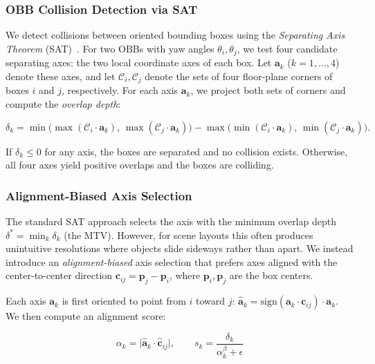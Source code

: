 \subsubsection{OBB Collision Detection via SAT}
\label{sec:method:obb_sat}

We detect collisions between oriented bounding boxes using the \emph{Separating Axis Theorem} (SAT)~\cite{gottschalk1996obbtree}.
For two OBBs with yaw angles $\theta_i, \theta_j$, we test four candidate separating axes: the two local coordinate axes of each box.
Let $\mathbf{a}_k$ ($k = 1, \ldots, 4$) denote these axes, and let $\mathcal{C}_i, \mathcal{C}_j$ denote the sets of four floor-plane corners of boxes $i$ and $j$, respectively.
For each axis $\mathbf{a}_k$, we project both sets of corners and compute the \emph{overlap depth}:

\begin{equation}
\delta_k = \min\!\big(\max(\mathcal{C}_i \cdot \mathbf{a}_k),\, \max(\mathcal{C}_j \cdot \mathbf{a}_k)\big) - \max\!\big(\min(\mathcal{C}_i \cdot \mathbf{a}_k),\, \min(\mathcal{C}_j \cdot \mathbf{a}_k)\big).
\label{eq:sat_overlap}
\end{equation}

\noindent If $\delta_k \leq 0$ for any axis, the boxes are separated and no collision exists.
Otherwise, all four axes yield positive overlaps and the boxes are colliding.

\subsubsection{Alignment-Biased Axis Selection}
\label{sec:method:axis_selection}

The standard SAT approach selects the axis with the minimum overlap depth $\delta^* = \min_k \delta_k$ (the MTV).
However, for scene layouts this often produces unintuitive resolutions where objects slide sideways rather than apart.
We instead introduce an \emph{alignment-biased} axis selection that prefers axes aligned with the center-to-center direction $\mathbf{c}_{ij} = \mathbf{p}_j - \mathbf{p}_i$, where $\mathbf{p}_i, \mathbf{p}_j$ are the box centers.

Each axis $\mathbf{a}_k$ is first oriented to point from $i$ toward $j$:
$\hat{\mathbf{a}}_k = \mathrm{sign}(\mathbf{a}_k \cdot \mathbf{c}_{ij}) \cdot \mathbf{a}_k$.
We then compute an alignment score:

\begin{equation}
\alpha_k = \big|\hat{\mathbf{a}}_k \cdot \hat{\mathbf{c}}_{ij}\big|, \qquad
s_k = \frac{\delta_k}{\alpha_k^{\beta} + \epsilon}
\label{eq:axis_score}
\end{equation}

